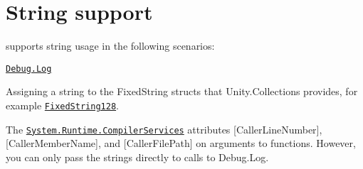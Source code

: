 \chapter{String support}
\hypertarget{md__hey_tea_9_2_library_2_package_cache_2com_8unity_8burst_0d1_88_87_2_documentation_0i_2csharp-string-support}{}\label{md__hey_tea_9_2_library_2_package_cache_2com_8unity_8burst_0d1_88_87_2_documentation_0i_2csharp-string-support}
\label{md__hey_tea_9_2_library_2_package_cache_2com_8unity_8burst_0d1_88_87_2_documentation_0i_2csharp-string-support_autotoc_md358}%
%
  supports string usage in the following scenarios\+:


\begin{DoxyItemize}
\item \href{https://docs.unity3d.com/ScriptReference/Debug.Log.html}{\texttt{ {\ttfamily Debug.\+Log}}}
\item Assigning a string to the {\ttfamily Fixed\+String} structs that {\ttfamily Unity.\+Collections} provides, for example \href{https://docs.unity3d.com/Packages/com.unity.collections@1.2/api/Unity.Collections.FixedString128.html}{\texttt{ {\ttfamily Fixed\+String128}}}.
\item The \href{https://docs.microsoft.com/en-us/dotnet/api/system.runtime.compilerservices?view=net-6.0}{\texttt{ {\ttfamily System.\+Runtime.\+Compiler\+Services}}} attributes {\ttfamily \mbox{[}Caller\+Line\+Number\mbox{]}}, {\ttfamily \mbox{[}Caller\+Member\+Name\mbox{]}}, and {\ttfamily \mbox{[}Caller\+File\+Path\mbox{]}} on arguments to  functions. However, you can only pass the strings directly to calls to {\ttfamily Debug.\+Log}.
\end{DoxyItemize}

